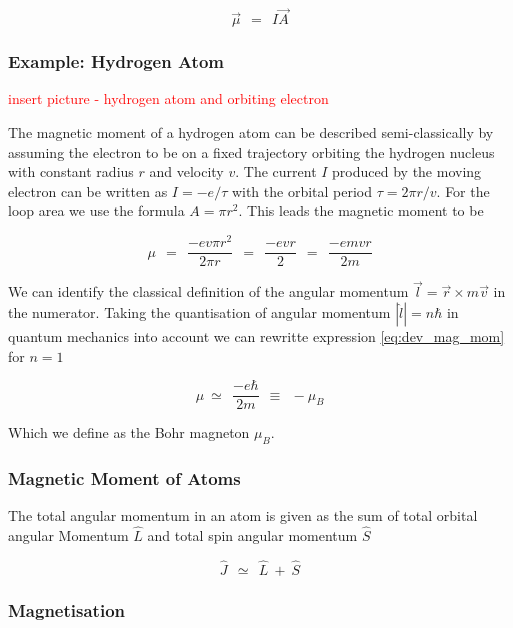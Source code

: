 \documentclass[10pt]{report}
\numberwithin{equation}{chapter}
\begin{document}
\begin{equation} \label{eq:mag_mom}
  \vec{\mu} ~~=~~ I \vec{A}
\end{equation}


\subsubsection{Example: Hydrogen Atom}

\textcolor{red}{insert picture - hydrogen atom and orbiting electron}

The magnetic moment of a hydrogen atom can be described semi-classically by assuming the electron to be on a fixed trajectory orbiting the hydrogen nucleus with constant radius $r$ and velocity $v$. The current $I$ produced by the moving electron can be written as $I = -e/\tau$ with the orbital period $\tau = 2\pi r/v$. For the loop area we use the formula $A= \pi r^2$. This leads the magnetic moment to be

\begin{equation} \label{eq:dev_mag_mom}
  \mu ~~=~~ \frac{-e v \pi r^2}{2 \pi r} ~~=~~ \frac{-evr}{2} ~~=~~ \frac{-e m v r}{2m}
\end{equation}

We can identify the classical definition of the angular momentum  $\vec{l} = \vec{r} \times m \vec{v}$ in the numerator. Taking the quantisation of angular momentum $|\hat{l}| = n \hbar$ in quantum mechanics into account we can rewritte expression \ref{eq:dev_mag_mom} for $n=1$

\begin{equation} \label{eq:bohr_mag}
  \mu ~≃ ~~ \frac{-e \hbar}{2m} ~~ \equiv ~~ -\mu_B
\end{equation}

Which we define as the Bohr magneton $\mu_B$.


\subsubsection{Magnetic Moment of Atoms}

The total angular momentum in an atom is given as the sum of total orbital angular Momentum $\hat{L}$  and total spin angular momentum $\hat{S}$

\begin{equation}
  \hat{J} ~~≃~~ \hat{L} ~+~ \hat{S}
\end{equation}

\subsubsection{Magnetisation}
\end{document}

